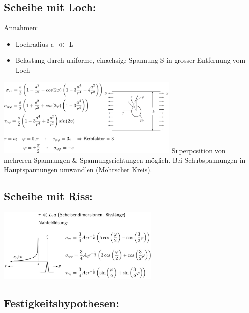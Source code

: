 \documentclass[a4paper,10pt]{article}
\begin{document}
\begin{multicols*}{3}
    \subsection{Scheibe mit Loch:}
        Annahmen:
        \begin{itemize}
            \item Lochradius a $\ll$ L
            \item Belastung durch uniforme, einachsige Spannung S in grosser Entfernung vom Loch
        \end{itemize}
        \includegraphics[width=90mm]{Scheibeloch}
        Superposition von mehreren Spannungen \& Spannungsrichtungen möglich. Bei Schubspannungen in Hauptspannungen umwandlen (Mohrscher Kreis).
    \subsection{Scheibe mit Riss:}
        \includegraphics[width=80mm]{Scheiberiss}
        
    \subsection{Festigkeitshypothesen:}

\end{multicols*}
\end{document}
